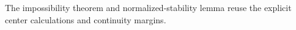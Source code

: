 The impossibility theorem and normalized-stability lemma reuse the explicit center calculations and continuity margins.